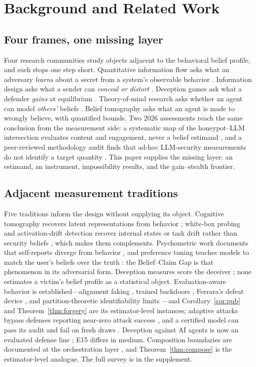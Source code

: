 \section{Background and Related Work}\label{sec:related}

\subsection{Four frames, one missing layer}\label{sec:frames}

Four research communities study objects adjacent to the behavioral belief
profile, and each stops one step short. Quantitative information flow asks
what an adversary \emph{learns} about a secret from a system's observable
behavior \cite{smith2009}. Information design asks what a sender
can \emph{conceal or distort} \cite{kamenica2011}. Deception games ask what
a defender \emph{gains} at equilibrium \cite{nguyen2019}. Theory-of-mind
research asks whether an agent can model \emph{others'} beliefs
\cite{strachan2024}. Belief tomography asks what an agent is made to wrongly
believe, with quantified bounds. Two 2026 assessments reach the same
conclusion from the measurement side: a systematic map of the honeypot--LLM
intersection evaluates content and engagement, never a belief estimand
\cite{bridges2026sok}, and a peer-reviewed methodology audit finds that
ad-hoc LLM-security measurements do not identify a target quantity
\cite{evertz2026shadows}. This paper supplies the missing layer: an estimand,
an instrument, impossibility results, and the gain--stealth frontier.

\subsection{Adjacent measurement traditions}
Five traditions inform the design without supplying its object. Cognitive
tomography recovers latent representations from behavior
\cite{houlsby2013}; white-box probing and activation-drift detection recover
internal states or task drift rather than security beliefs
\cite{abdelnabi2025drift,marks2025audit}, which makes them complements.
Psychometric work documents that self-reports diverge from behavior
\cite{shen2025}, and preference tuning teaches models to match the
user's beliefs over the truth \cite{sharma2024}: the Belief--Claim Gap is that
phenomenon in its adversarial form. Deception measures
score the deceiver \cite{mask2025}; none estimates a victim's belief profile
as a statistical object. Evaluation-aware behavior is established---alignment
faking \cite{greenblatt2024faking}, trained backdoors
\cite{sleeperagents2024}, Ferrara's defeat device \cite{ferrara2026}, and
partition-theoretic identifiability limits \cite{mahran2026}---and
Corollary~\ref{cor:pub} and Theorem~\ref{thm:forgery} are its estimator-level
instances; adaptive attacks bypass defenses reporting near-zero attack success
\cite{nasr2026attacker}, and a certified model can pass its audit and fail on
fresh draws \cite{luck2026certified}. Deception against AI agents is now an
evaluated defense line \cite{ayzenshteyn2025cloak,volkov2024}; E15 differs in
medium. Composition boundaries are documented at the orchestration layer
\cite{li2026ace,camel2026}, and Theorem~\ref{thm:compose} is the
estimator-level analogue. The full survey is in the supplement.
